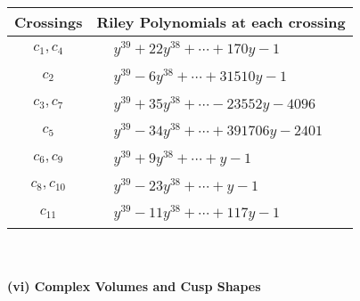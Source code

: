 \documentclass[1p]{elsarticle_modified}
\theoremstyle{definition}
\begin{document}
\begin{tabular}{m{50pt}|m{274pt}}
Crossings & \hspace{64pt}Riley Polynomials at each crossing \\
\hline $$\begin{aligned}c_{1},c_{4}\end{aligned}$$&$\begin{aligned}
&y^{39}+22 y^{38}+\cdots+170 y-1
\end{aligned}$\\
\hline $$\begin{aligned}c_{2}\end{aligned}$$&$\begin{aligned}
&y^{39}-6 y^{38}+\cdots+31510 y-1
\end{aligned}$\\
\hline $$\begin{aligned}c_{3},c_{7}\end{aligned}$$&$\begin{aligned}
&y^{39}+35 y^{38}+\cdots-23552 y-4096
\end{aligned}$\\
\hline $$\begin{aligned}c_{5}\end{aligned}$$&$\begin{aligned}
&y^{39}-34 y^{38}+\cdots+391706 y-2401
\end{aligned}$\\
\hline $$\begin{aligned}c_{6},c_{9}\end{aligned}$$&$\begin{aligned}
&y^{39}+9 y^{38}+\cdots+y-1
\end{aligned}$\\
\hline $$\begin{aligned}c_{8},c_{10}\end{aligned}$$&$\begin{aligned}
&y^{39}-23 y^{38}+\cdots+y-1
\end{aligned}$\\
\hline $$\begin{aligned}c_{11}\end{aligned}$$&$\begin{aligned}
&y^{39}-11 y^{38}+\cdots+117 y-1
\end{aligned}$\\
\hline
\end{tabular}\\~\\
\newpage\flushleft \textbf{(vi) Complex Volumes and Cusp Shapes}
\end{document}
